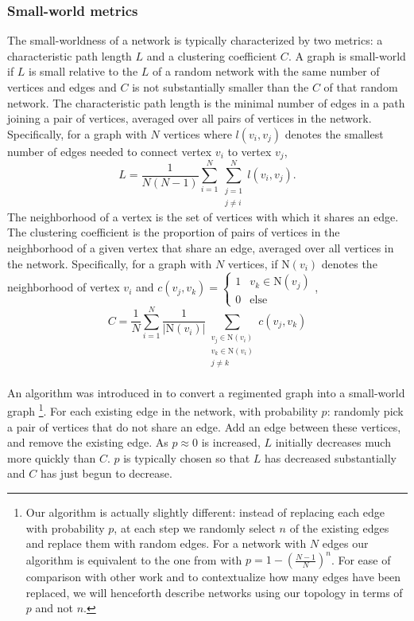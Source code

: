 \documentclass{article}
\newcommand{\npar}{\\\indent}
\begin{document}
\subsubsection{Small-world metrics}
The small-worldness of a network is typically characterized by two metrics: a characteristic path length $L$ and a clustering coefficient $C$. A graph is small-world if $L$ is small relative to the $L$ of a random network with the same number of vertices and edges and $C$ is not substantially smaller than the $C$ of that random network. The characteristic path length is the minimal number of edges in a path joining a pair of vertices, averaged over all pairs of vertices in the network. Specifically, for a graph with $N$ vertices where $l(v_i,v_j)$ denotes the smallest number of edges needed to connect vertex $v_i$ to vertex $v_j$, 
\begin{equation}
\label{eqn:charpathlength}
L=\frac{1}{N(N-1)}\sum_{i=1}^{N}\sum_{\substack{j=1\\j\neq i}}^{N}l(v_i,v_j).
\end{equation}
The neighborhood of a vertex is the set of vertices with which it shares an edge. The clustering coefficient is the proportion of pairs of vertices in the neighborhood of a given vertex that share an edge, averaged over all vertices in the network. Specifically, for a graph with $N$ vertices, if $\text{N}(v_i)$ denotes the neighborhood of vertex $v_i$ and $c(v_j,v_k)=\begin{cases}1 & v_k\in\text{N}(v_j)\\0 & \text{else}\end{cases}$,
\begin{equation}
\label{eqn:clustcoeff}
C=\frac{1}{N}\sum_{i=1}^{N}\frac{1}{|\text{N}(v_i)|}\sum_{\substack{v_j\in \text{N}(v_i)\\v_k\in\text{N}(v_i)\\j\neq k}}c(v_j,v_k)
\end{equation}
\npar
An algorithm was introduced in \cite{watts98} to convert a regimented graph into a small-world graph
\footnote{Our algorithm is actually slightly different: instead of replacing each edge with probability $p$, at each step we randomly select $n$ of the existing edges and replace them with random edges. For a network with $N$ edges our algorithm is equivalent to the one from \cite{watts98} with $p=1-(\frac{N-1}{N})^n$. For ease of comparison with other work and to contextualize how many edges have been replaced, we will henceforth describe networks using our topology in terms of $p$ and not $n$.}.
 For each existing edge in the network, with probability $p$: randomly pick a pair of vertices that do not share an edge. Add an edge between these vertices, and remove the existing edge. As $p\approx 0$ is increased, $L$ initially decreases much more quickly than $C$. $p$ is typically chosen so that $L$ has decreased substantially and $C$ has just begun to decrease.
\end{document}
